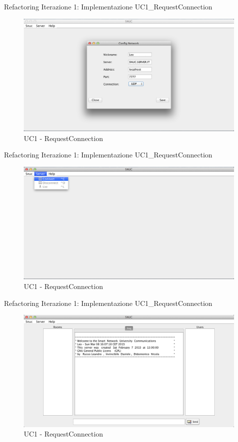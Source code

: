  \begin{frame} {Refactoring Iterazione 1: Implementazione  UC1\_RequestConnection }
   \begin{figure}
    \includegraphics[scale=0.32]{image_implementation/uc1/3.png}{\centering}
    \caption{UC1 - RequestConnection}
   \end{figure}
 \end{frame}

 \begin{frame} {Refactoring Iterazione 1: Implementazione  UC1\_RequestConnection }
   \begin{figure}
    \includegraphics[scale=0.32]{image_implementation/uc1/4.png}{\centering}
    \caption{UC1 - RequestConnection}
   \end{figure}
 \end{frame}

 \begin{frame} {Refactoring Iterazione 1: Implementazione  UC1\_RequestConnection }
   \begin{figure}
    \includegraphics[scale=0.32]{image_implementation/uc1/5.png}{\centering}
    \caption{UC1 - RequestConnection}
   \end{figure}
 \end{frame}

